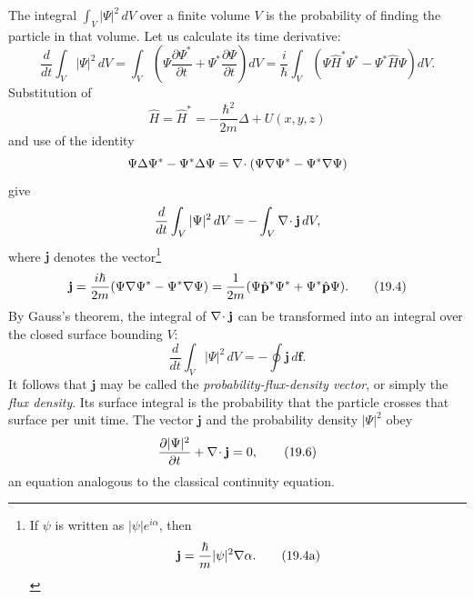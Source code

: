 The integral $\int_V|\Psi|^2\,dV$ over a finite volume $V$ is the probability
of finding the particle in that volume. Let us calculate its time derivative:
\[
  \frac{d}{dt}\int_V|\Psi|^2\,dV
  =\int_V\left(\Psi\frac{\partial\Psi^*}{\partial t}
  +\Psi^*\frac{\partial\Psi}{\partial t}\right)dV
  =\frac{i}{\hbar}\int_V
  \left(\Psi\hat H^*\Psi^*-\Psi^*\hat H\Psi\right)dV.
\]
Substitution of
\[
  \hat H=\hat H^*=-\frac{\hbar^2}{2m}\Delta+U(x,y,z)
\]
and use of the identity
\[
  \Psi\Delta\Psi^*-\Psi^*\Delta\Psi
  =\nabla\!\cdot (\Psi\nabla \Psi^*-\Psi^*\nabla \Psi)
\]
give
\[
  \frac{d}{dt}\int_V|\Psi|^2\,dV
  =-\int_V\nabla\!\cdot \mathbf j\,dV,
\]
where $\mathbf j$ denotes the vector\footnote{If $\psi$ is written as
$|\psi|e^{i\alpha}$, then
\begin{equation}
  \mathbf j=\frac{\hbar}{m}|\psi|^2\nabla \alpha.
  \tag{19.4a}
\end{equation}}
\begin{equation}
  \mathbf j=\frac{i\hbar}{2m}
  (\Psi\nabla \Psi^*-\Psi^*\nabla \Psi)
  =\frac{1}{2m}
  (\Psi\hat{\mathbf p}^{*}\Psi^*+\Psi^*\hat{\mathbf p}\Psi).
  \tag{19.4}
\end{equation}
By Gauss's theorem, the integral of $\nabla\!\cdot \mathbf j$ can be transformed into
an integral over the closed surface bounding $V$:
\begin{equation}
  \frac{d}{dt}\int_V|\Psi|^2\,dV
  =-\oint\mathbf j\,d\mathbf f.
  \tag{19.5}
\end{equation}
It follows that $\mathbf j$ may be called the \emph{probability-flux-density
vector}, or simply the \emph{flux density}. Its surface integral is the
probability that the particle crosses that surface per unit time. The vector
$\mathbf j$ and the probability density $|\Psi|^2$ obey
\begin{equation}
  \frac{\partial|\Psi|^2}{\partial t}+\nabla\!\cdot \mathbf j=0,
  \tag{19.6}
\end{equation}
an equation analogous to the classical continuity equation.

